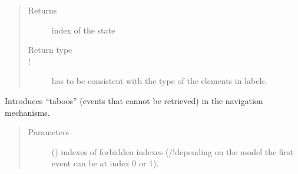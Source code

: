 \documentclass[letterpaper,10pt,english]{sphinxmanual}
\begin{document}
\begin{fulllineitems}
\begin{fulllineitems}
\begin{quote}
\begin{description}
\begin{itemize}
\end{itemize}

\item[{Returns}] \leavevmode
index of the state

\item[{Return type}] \leavevmode
{}

\item[{!}] \leavevmode
{} has to be consistent with the type of the elements in labels.

\end{description}\end{quote}

\end{fulllineitems}


\begin{fulllineitems}
\label{\detokenize{index:Navigator.Navigator.forbid_indexes}}
Introduces “taboos” (events that cannot be retrieved) in the navigation mechanisms.
\begin{quote}\begin{description}
\item[{Parameters}] \leavevmode
{} (\sphinxstyleliteralemphasis{(}\sphinxstyleliteralemphasis{)}) \textendash{} indexes of forbidden indexes (/!depending on the model the first event can be at index 0 or 1).

\end{description}\end{quote}

\end{fulllineitems}



\end{fulllineitems}
\end{document}
